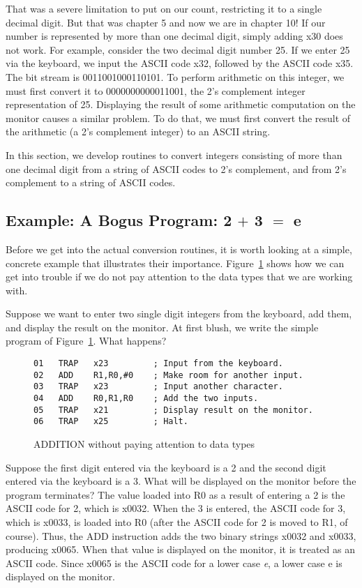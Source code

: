 \documentclass{patt}
\begin{document}
That was a severe limitation to put on our count, restricting it
to a single decimal digit.  But that was chapter 5 and now we are in 
chapter 10!  If our number is represented by more than one decimal digit, 
simply adding x30 does not work.  For example, consider the two decimal digit 
number 25.  If we enter 25 via the keyboard, we input the ASCII code x32, 
followed by the ASCII code x35.  The bit stream is 0011001000110101.  To 
perform arithmetic on this integer, we must first convert it to 
0000000000011001, the 2's complement integer representation of 25.  
Displaying the result of some arithmetic computation on the monitor causes
a similar problem.  To do that, we must first convert the result of the 
arithmetic (a 2's complement integer) to an ASCII string.

In this section, we develop routines to convert integers consisting of 
more than one decimal digit from a string of ASCII codes to 2's complement,
and from 2's complement to a string of ASCII codes. 

\subsection{Example: A Bogus Program: 2 $+$ 3 $=$ e}

Before we get into the actual conversion routines, it is worth looking at
a simple, concrete example that illustrates their importance.
Figure~\ref{fig:bogus.addition} shows how  we can get into trouble if we 
do not pay attention to the data types that we are working with.

Suppose we want to enter two single digit integers from the keyboard, add them,
and display the result on the monitor. At first blush, we write the
simple program of Figure~\ref{fig:bogus.addition}. What happens?

\begin{figure}[h!]
\begin{Verbatim}[fontsize=\fontsize{9}{11}\selectfont]
01   TRAP   x23         ; Input from the keyboard.
02   ADD    R1,R0,#0    ; Make room for another input.
03   TRAP   x23         ; Input another character.
04   ADD    R0,R1,R0    ; Add the two inputs.
05   TRAP   x21         ; Display result on the monitor.
06   TRAP   x25         ; Halt.
\end{Verbatim}
\caption{ADDITION without paying attention to data types}
\label{fig:bogus.addition}
\end{figure}

Suppose the first digit entered via the keyboard is a 2 and the second
digit entered via the keyboard is a 3. What will be displayed on the
monitor before the program terminates? The value loaded into R0 as a
result of entering a 2 is the ASCII code for 2, which is x0032. When
the 3 is entered, the ASCII code for 3, which is x0033, is
loaded into R0 (after the ASCII code for 2 is moved to R1, of course).  
Thus, the ADD instruction adds the two binary strings
x0032 and x0033, producing x0065. When that value is displayed on the
monitor, it is treated as an ASCII code. Since x0065 is the ASCII
code for a lower case {\em e}, a lower case e is displayed on the monitor.
\end{document}
